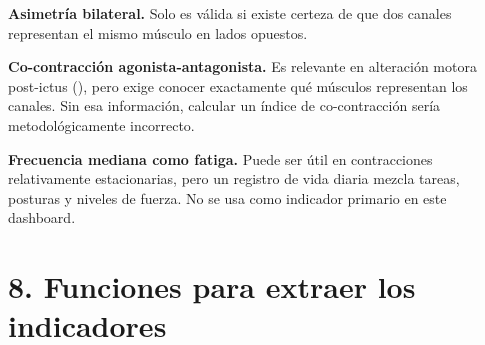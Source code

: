 \documentclass[
  spanish,
  a4paper,
  DIV=11,
  numbers=noendperiod]{scrreprt}
\begin{document}
\textbf{Asimetría bilateral.} Solo es válida si existe certeza de que
dos canales representan el mismo músculo en lados opuestos.

\textbf{Co-contracción agonista-antagonista.} Es relevante en alteración
motora post-ictus (), pero
exige conocer exactamente qué músculos representan los canales. Sin esa
información, calcular un índice de co-contracción sería
metodológicamente incorrecto.

\textbf{Frecuencia mediana como fatiga.} Puede ser útil en contracciones
relativamente estacionarias, pero un registro de vida diaria mezcla
tareas, posturas y niveles de fuerza. No se usa como indicador primario
en este dashboard.

\chapter{8. Funciones para extraer los
indicadores}\label{funciones-para-extraer-los-indicadores}
\end{document}

